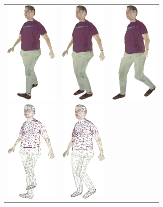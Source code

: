 \begin{figure}
\begin{center}
\begin{tabular}{ccc}
\includegraphics[height=5cm]{../images/james_texture1} &
\includegraphics[height=5cm]{../images/james_texture2} &
\includegraphics[height=5cm]{../images/james_texture3} \\
\includegraphics[height=5cm]{../images/james_wire1} &
\includegraphics[height=5cm]{../images/james_wire2} &

\end{tabular}
\end{center}
\end{figure}
